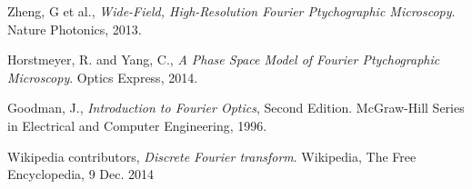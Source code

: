 \documentclass[11pt,a4paper,journal]{IEEEtran}
\begin{document}
\begin{thebibliography}{10}

  Zheng, G et al.,
  \emph{Wide-Field, High-Resolution Fourier Ptychographic Microscopy}.
  Nature Photonics,
  2013.
  
  Horstmeyer, R. and Yang, C.,
  \emph{A Phase Space Model of Fourier Ptychographic Microscopy}.
  Optics Express,
  2014.
  
  Goodman, J.,
  \emph{Introduction to Fourier Optics}, Second Edition.
  McGraw-Hill Series in Electrical and Computer Engineering,
  1996.

  Wikipedia contributors,
  \emph{Discrete Fourier transform}.
  Wikipedia, The Free Encyclopedia,
  9 Dec. 2014
  
\end{thebibliography}
\end{document}
